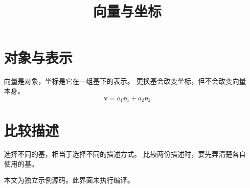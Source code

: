\documentclass[UTF8]{ctexart}
\title{向量与坐标}
\author{}
\date{}
\begin{document}
\maketitle

\section{对象与表示}
向量是对象，坐标是它在一组基下的表示。
更换基会改变坐标，但不会改变向量本身。
\[
  \mathbf{v} = a_1\mathbf{e}_1 + a_2\mathbf{e}_2
\]

\section{比较描述}
选择不同的基，相当于选择不同的描述方式。
比较两份描述时，要先弄清楚各自使用的基。

本文为独立示例源码。此界面未执行编译。
\end{document}
